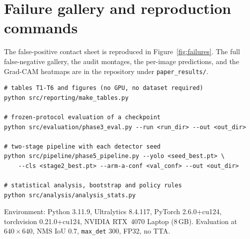 \section{Failure gallery and reproduction commands}
\label{app:repro}

The false-positive contact sheet is reproduced in Figure~\ref{fig:failures}. The
full false-negative gallery, the audit montages, the per-image predictions, and
the Grad-CAM heatmaps are in the repository under \texttt{paper\_results/}.

\begin{table}[t]
\begin{verbatim}
# tables T1-T6 and figures (no GPU, no dataset required)
python src/reporting/make_tables.py

# frozen-protocol evaluation of a checkpoint
python src/evaluation/phase3_eval.py --run <run_dir> --out <out_dir>

# two-stage pipeline with each detector seed
python src/pipeline/phase5_pipeline.py --yolo <seed_best.pt> \
    --cls <stage2_best.pt> --arm-a-conf <val_conf> --out <out_dir>

# statistical analysis, bootstrap and policy rules
python src/analysis/analysis_stats.py
\end{verbatim}
\end{table}

Environment: Python 3.11.9, Ultralytics 8.4.117, PyTorch 2.6.0+cu124,
torchvision 0.21.0+cu124, NVIDIA RTX~4070 Laptop (8\,GB). Evaluation at
$640\times640$, NMS IoU $0.7$, \texttt{max\_det} $300$, FP32, no TTA.
